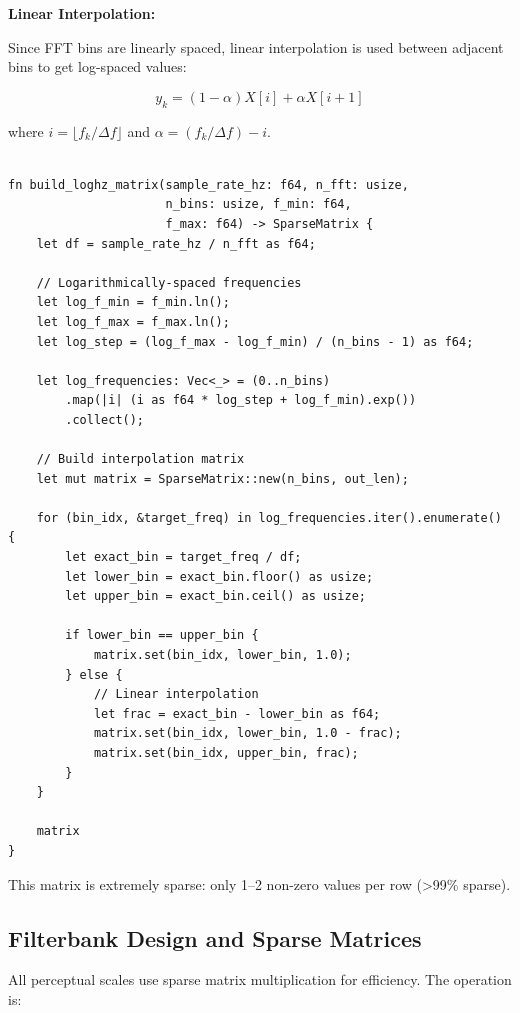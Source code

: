 \textbf{Linear Interpolation:}

Since FFT bins are linearly spaced, linear interpolation is used
between adjacent bins to get log-spaced values:

\begin{equation}
  y_k = (1 - \alpha) X[i] + \alpha X[i+1]
\end{equation}

where $i = \lfloor f_k / \Delta f \rfloor$ and $\alpha = (f_k / \Delta f) - i$.

\begin{lstlisting}[caption={Log-frequency interpolation via sparse matrix}]

fn build_loghz_matrix(sample_rate_hz: f64, n_fft: usize,
                      n_bins: usize, f_min: f64,
                      f_max: f64) -> SparseMatrix {
    let df = sample_rate_hz / n_fft as f64;

    // Logarithmically-spaced frequencies
    let log_f_min = f_min.ln();
    let log_f_max = f_max.ln();
    let log_step = (log_f_max - log_f_min) / (n_bins - 1) as f64;

    let log_frequencies: Vec<_> = (0..n_bins)
        .map(|i| (i as f64 * log_step + log_f_min).exp())
        .collect();

    // Build interpolation matrix
    let mut matrix = SparseMatrix::new(n_bins, out_len);

    for (bin_idx, &target_freq) in log_frequencies.iter().enumerate() {
        let exact_bin = target_freq / df;
        let lower_bin = exact_bin.floor() as usize;
        let upper_bin = exact_bin.ceil() as usize;

        if lower_bin == upper_bin {
            matrix.set(bin_idx, lower_bin, 1.0);
        } else {
            // Linear interpolation
            let frac = exact_bin - lower_bin as f64;
            matrix.set(bin_idx, lower_bin, 1.0 - frac);
            matrix.set(bin_idx, upper_bin, frac);
        }
    }

    matrix
}
\end{lstlisting}

This matrix is extremely sparse: only 1--2 non-zero values per row
(>99\% sparse).

\subsection{Filterbank Design and Sparse Matrices}

All perceptual scales use sparse matrix multiplication for
efficiency. The operation is:

